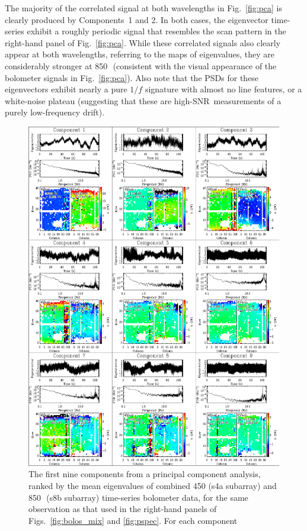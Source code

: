 \documentclass[useAMS,usenatbib,nofootinbib]{mn2e}
\newcommand{\snr}{SNR}
\begin{document}
The majority of the correlated signal at both wavelengths in
Fig.~\ref{fig:pca} is clearly produced by Components~1 and 2. In both
cases, the eigenvector time-series exhibit a roughly periodic signal
that resembles the scan pattern in the right-hand panel of
Fig.~\ref{fig:pca}. While these correlated signals also clearly appear
at both wavelengths, referring to the maps of eigenvalues, they are
considerably stronger at 850\,\micron\ (consistent with the visual
appearance of the bolometer signals in Fig.~\ref{fig:pca}). Also note
that the PSDs for these eigenvectors exhibit nearly a pure $1/f$
signature with almost no line features, or a white-noise plateau
(suggesting that these are high-\snr\ measurements of a purely
low-frequency drift).

\begin{figure}
\centering
\includegraphics[width=0.85\linewidth]{pca}
\caption{The first nine components from a principal component
  analysis, ranked by the mean eigenvalues of combined 450 (s4a
  subarray) and 850\,\micron\ (s8b subarray) time-series bolometer
  data, for the same observation as that used in the right-hand panels
  of Figs.~\ref{fig:bolos_mix} and \ref{fig:pspec}. For each component
}
\end{figure}
\end{document}
